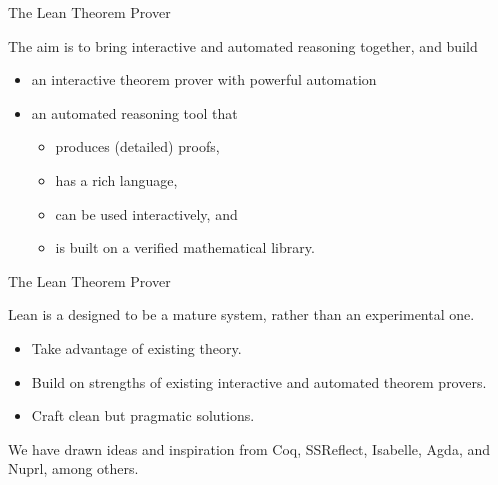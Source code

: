 \documentclass[xcolor=table]{beamer}
\begin{document}
\begin{frame}{The Lean Theorem Prover}

The aim is to bring interactive and automated reasoning together, and build
\begin{itemize}
 \item an interactive theorem prover with powerful automation
 \item an automated reasoning tool that
 \begin{itemize}
 \item produces (detailed) proofs,
 \item has a rich language,
 \item can be used interactively, and
 \item is built on a verified mathematical library.
 \end{itemize}
\end{itemize}

\end{frame}

\begin{frame}{The Lean Theorem Prover}

Lean is a designed to be a mature system, rather than an experimental one.
\begin{itemize}
 \item Take advantage of existing theory.
 \item Build on strengths of existing interactive and automated theorem provers.
 \item Craft clean but pragmatic solutions.
\end{itemize}

\bigskip

We have drawn ideas and inspiration from Coq, SSReflect, Isabelle, Agda, and Nuprl, among others.

\end{frame}


\end{document}
